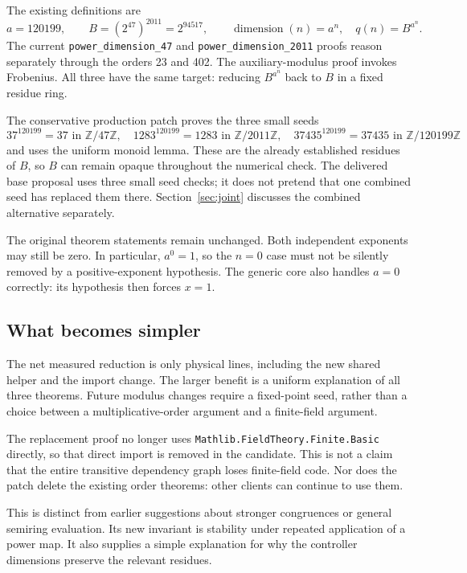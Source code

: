 \documentclass[11pt,letterpaper]{article}
\newcommand{\code}[1]{\nolinkurl{#1}}
\newcommand{\ZZ}{\mathbb Z}
\newcommand{\Zmod}[1]{\ZZ/#1\ZZ}
\begin{document}
The existing definitions are
\[
 a=120199,\qquad B=(2^{47})^{2011}=2^{94517},\qquad
 \operatorname{dimension}(n)=a^n,\quad q(n)=B^{a^n}.
\]
The current \code{power_dimension_47} and \code{power_dimension_2011} proofs reason separately through the orders 23 and 402. The auxiliary-modulus proof invokes Frobenius. All three have the same target: reducing \(B^{a^n}\) back to \(B\) in a fixed residue ring.

The conservative production patch proves the three small seeds
\[
37^{120199}=37\text{ in }\Zmod{47},\quad
1283^{120199}=1283\text{ in }\Zmod{2011},\quad
37435^{120199}=37435\text{ in }\Zmod{120199}
\]
and uses the uniform monoid lemma. These are the already established residues of \(B\), so \(B\) can remain opaque throughout the numerical check. The delivered base proposal uses three small seed checks; it does not pretend that one combined seed has replaced them there. Section~\ref{sec:joint} discusses the combined alternative separately.

The original theorem statements remain unchanged. Both independent exponents may still be zero. In particular, \(a^0=1\), so the \(n=0\) case must not be silently removed by a positive-exponent hypothesis. The generic core also handles \(a=0\) correctly: its hypothesis then forces \(x=1\).

\subsection{What becomes simpler}

The net measured reduction is only \PowerSaved{} physical lines, including the new shared helper and the import change. The larger benefit is a uniform explanation of all three theorems. Future modulus changes require a fixed-point seed, rather than a choice between a multiplicative-order argument and a finite-field argument.

The replacement proof no longer uses \code{Mathlib.FieldTheory.Finite.Basic} directly, so that direct import is removed in the candidate. This is not a claim that the entire transitive dependency graph loses finite-field code. Nor does the patch delete the existing order theorems: other clients can continue to use them.

This is distinct from earlier suggestions about stronger congruences or general semiring evaluation. Its new invariant is stability under repeated application of a power map. It also supplies a simple explanation for why the controller dimensions preserve the relevant residues.
\end{document}

